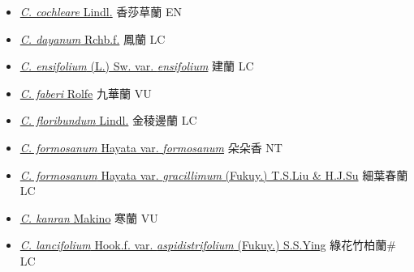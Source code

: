 \begin{itemize}
  \begin{itemize}
        \item[] \href{http://www.theplantlist.org/tpl1.1/search?q=Cymbidium+cochleare}{\textit{C. cochleare} Lindl.}   香莎草蘭 EN
        \item[] \href{http://www.theplantlist.org/tpl1.1/search?q=Cymbidium+dayanum}{\textit{C. dayanum} Rchb.f.}   鳳蘭 LC
        \item[] \href{http://www.theplantlist.org/tpl1.1/search?q=Cymbidium+ensifolium+var.+ensifolium}{\textit{C. ensifolium} (L.) Sw. var. \textit{ensifolium}}   建蘭 LC
        \item[] \href{http://www.theplantlist.org/tpl1.1/search?q=Cymbidium+faberi}{\textit{C. faberi} Rolfe}   九華蘭 VU
        \item[] \href{http://www.theplantlist.org/tpl1.1/search?q=Cymbidium+floribundum}{\textit{C. floribundum} Lindl.}   金稜邊蘭 LC
        \item[] \href{http://www.theplantlist.org/tpl1.1/search?q=Cymbidium+formosanum+var.+formosanum}{\textit{C. formosanum} Hayata var. \textit{formosanum}}   朵朵香 NT
        \item[] \href{http://www.theplantlist.org/tpl1.1/search?q=Cymbidium+formosanum+var.+gracillimum}{\textit{C. formosanum} Hayata var. \textit{gracillimum} (Fukuy.) T.S.Liu \& H.J.Su}     細葉春蘭 LC
        \item[] \href{http://www.theplantlist.org/tpl1.1/search?q=Cymbidium+kanran}{\textit{C. kanran} Makino}   寒蘭 VU
        \item[] \href{http://www.theplantlist.org/tpl1.1/search?q=Cymbidium+lancifolium+var.+aspidistrifolium}{\textit{C. lancifolium} Hook.f. var. \textit{aspidistrifolium} (Fukuy.) S.S.Ying}   綠花竹柏蘭\# LC

\end{itemize}
\end{itemize}
